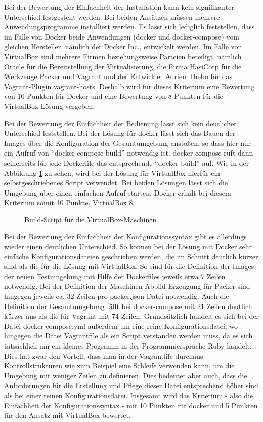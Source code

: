 Bei der Bewertung der Einfachheit der Installation kann kein signifikanter Unterschied festgestellt werden. Bei beiden Ansätzen müssen mehrere Anwendungsprogramme installiert werden. Es lässt sich lediglich feststellen, dass im Falle von Docker beide Anwendungen (docker und docker-compose) vom gleichen Hersteller, nämlich der Docker Inc., entwickelt werden. Im Falle von VirtualBox sind mehrere Firmen beziehungsweise Parteien beteiligt, nämlich Oracle für die Bereitstellung der Virtualisierung, die Firma HasiCorp für die Werkzeuge Packer und Vagrant und der Entwickler Adrien Thebo für das Vagrant-Plugin vagrant-hosts. Deshalb wird für dieses Kriterium eine Bewertung von 10 Punkten für Docker und eine Bewertung von 8 Punkten für die VirtualBox-Lösung vergeben.

Bei der Bewertung der Einfachheit der Bedienung lässt sich kein deutlicher Unterschied feststellen. Bei der Lösung für docker lässt sich das Bauen der Images über die Konfiguration der Gesamtumgebung anstoßen, so dass hier nur ein Aufruf von "`docker-compose build"' notwendig ist. docker-compose ruft dann seinerseits für jede Dockerfile das entsprechende "`docker build"' auf. Wie in der Abbildung \ref{buildvb} zu sehen, wird bei der Lösung für VirtualBox hierfür ein selbstgeschriebenes Script verwendet. Bei beiden Lösungen lässt sich die Umgebung über einen einfachen Aufruf starten. Docker erhält bei diesem Kriterium somit 10 Punkte, VirtualBox 8.

\begin{figure}[!ht]
  \begin{center}
    \caption{Build-Script für die VirtualBox-Maschinen}
    \label{buildvb}
  \end{center}
\end{figure}

Bei der Bewertung der Einfachheit der Konfigurationssyntax gibt es allerdings wieder einen deutlichen Unterschied. So können bei der Lösung mit Docker sehr einfache Konfigurationsdateien geschrieben werden, die im Schnitt deutlich kürzer sind als die für die Lösung mit VirtualBox. So sind für die Definition der Images der neuen Testumgebung mit Hilfe der Dockerfiles jeweils etwa 7 Zeilen notwendig. Bei der Definition der Maschinen-Abbild-Erzeugung für Packer sind hingegen jeweils ca. 32 Zeilen pro packer.json-Datei notwendig. Auch die Definition der Gesamtumgebung fällt bei docker-compose mit 21 Zeilen deutlich kürzer aus als die für Vagrant mit 74 Zeilen. Grundsätzlich handelt es sich bei der Datei docker-compose.yml außerdem um eine reine Konfigurationsdatei, wo hingegen die Datei Vagrantfile als ein Script verstanden werden muss, da es sich tatsächlich um ein kleines Programm in der Programmiersprache Ruby handelt. Dies hat zwar den Vorteil, dass man in der Vagrantfile durchaus Kontrollstrukturen wie zum Beispiel eine Schleife verwenden kann, um die Umgebung mit weniger Zeilen zu definieren. Dies bedeutet aber auch, dass die Anforderungen für die Erstellung und Pflege dieser Datei entsprechend höher sind als bei einer reinen Konfigurationsdatei. Insgesamt wird das Kriterium - also die Einfachheit der Konfigurationssyntax - mit 10 Punkten für docker  und 5 Punkten für den Ansatz mit VirtualBox bewertet.

